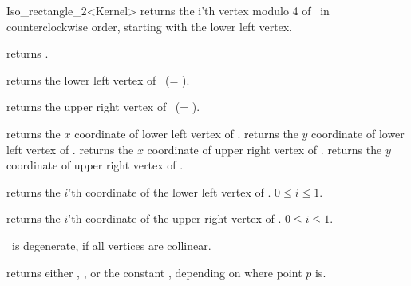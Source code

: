 \begin{ccRefClass} {Iso_rectangle_2<Kernel>}
       {returns the i'th vertex modulo 4  of \ccVar\ in counterclockwise order, 
        starting with the lower left vertex.}

       {returns  .}

       {returns the lower left vertex of \ccVar\ (= ).}


       {returns the upper right vertex of \ccVar\ (= ).}

       {returns the $x$ coordinate of lower left vertex of \ccVar.}
\ccGlue
{}
       {returns the $y$ coordinate of lower left vertex of \ccVar.}
\ccGlue
{}
       {returns the $x$ coordinate of upper right vertex of \ccVar.}
\ccGlue
{}
       {returns the $y$ coordinate of upper right vertex of \ccVar.}

       {returns the $i$'th  coordinate of the
        lower left vertex of \ccVar. 
        \ccPrecond $0 \leq i \leq 1$.}

       {returns the $i$'th  coordinate of the
        upper right vertex of \ccVar. 
        \ccPrecond $0 \leq i \leq 1$.}

\ccPredicates

       {%
        \ccVar\ is degenerate, if all vertices
        are collinear.}

       {returns either ,
        , or the constant
        , 
        depending on where point $p$ is.}

       {}
\ccGlue
{}
       {}
\ccGlue
{}
       {}



\end{ccRefClass}
